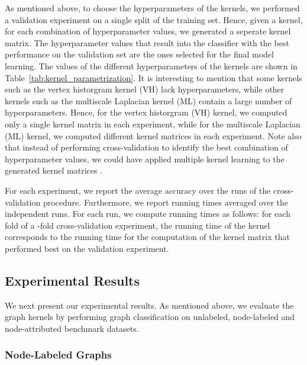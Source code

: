 \documentclass[twoside,11pt]{article}
\begin{document}
As mentioned above, to choose the hyperparameters of the kernels, we performed a validation experiment on a single  split of the training set.
Hence, given a kernel, for each combination of hyperparameter values, we generated a seperate kernel matrix.
The hyperparameter values that result into the classifier with the best performance on the validation set are the ones selected for the final model learning.
The values of the different hyperparameters of the kernels are shown in Table~\ref{tab:kernel_parametrization}.
It is interesting to mention that some kernels such as the vertex historgram kernel (VH) lack hyperparameters, while other kernels such as the multiscale Laplacian kernel (ML) contain a large number of hyperparameters.
Hence, for the vertex historgram (VH) kernel, we computed only a single kernel matrix in each experiment, while for the multiscale Laplacian (ML) kernel, we computed  different kernel matrices in each experiment.
Note also that instead of performing cross-validation to identify the best combination of hyperparameter values, we could have applied multiple kernel learning to the generated kernel matrices \cite{massimo2016hyper}.

For each experiment, we report the average accuracy over the  runs of the cross-validation procedure.
Furthermore, we report running times averaged over the  independent runs.
For each run, we compute running times as follows: for each fold of a -fold cross-validation experiment, the running time of the kernel corresponds to the running time for the computation of the kernel matrix that performed best on the validation experiment.


\subsection{Experimental Results}
We next present our experimental results.
As mentioned above, we evaluate the graph kernels by performing graph classification on unlabeled, node-labeled and node-attributed benchmark datasets.

\subsubsection{Node-Labeled Graphs}
\end{document}
